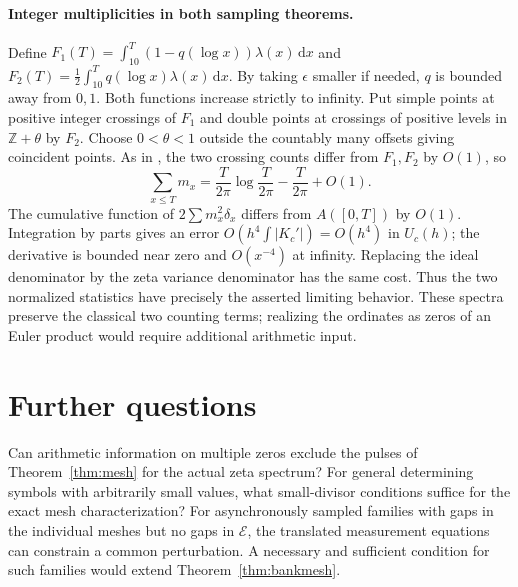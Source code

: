 \documentclass[11pt,letterpaper]{article}
\theoremstyle{definition}
\newcommand{\Z}{\mathbb Z}
\newcommand{\dd}{\,\mathrm d}
\begin{document}
\paragraph{Integer multiplicities in both sampling theorems.}
Define $F_1(T)=\int_{10}^T(1-q(\log x))\lambda(x)\dd x$ and $F_2(T)=\tfrac12\int_{10}^T q(\log x)\lambda(x)\dd x$. By taking $\epsilon$ smaller if needed, $q$ is bounded away from $0,1$. Both functions increase strictly to infinity. Put simple points at positive integer crossings of $F_1$ and double points at crossings of positive levels in $\Z+\theta$ by $F_2$. Choose $0<\theta<1$ outside the countably many offsets giving coincident points. As in \cite{four}, the two crossing counts differ from $F_1,F_2$ by $O(1)$, so
\[
 \sum_{x\le T}m_x=\frac{T}{2\pi}\log\frac{T}{2\pi}-\frac{T}{2\pi}+O(1).
\]
The cumulative function of $2\sum m_x^2\delta_x$ differs from $A([0,T])$ by $O(1)$. Integration by parts gives an error $O(h^4\int|K_c'|)=O(h^4)$ in $U_c(h)$; the derivative is bounded near zero and $O(x^{-4})$ at infinity. Replacing the ideal denominator by the zeta variance denominator has the same cost. Thus the two normalized statistics have precisely the asserted limiting behavior. These spectra preserve the classical two counting terms; realizing the ordinates as zeros of an Euler product would require additional arithmetic input.


\section*{Further questions}
Can arithmetic information on multiple zeros exclude the pulses of Theorem~\ref{thm:mesh} for the actual zeta spectrum? For general determining symbols with arbitrarily small values, what small-divisor conditions suffice for the exact mesh characterization? For asynchronously sampled families with gaps in the individual meshes but no gaps in $\mathcal E$, the translated measurement equations can constrain a common perturbation. A necessary and sufficient condition for such families would extend Theorem~\ref{thm:bankmesh}.
\end{document}
